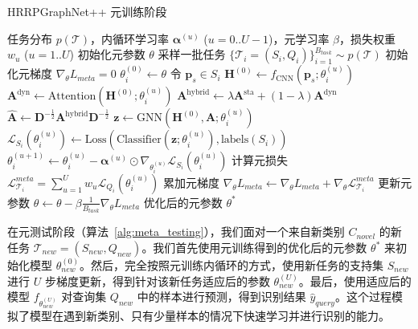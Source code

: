 \begin{algorithm}[h!]
\caption{HRRPGraphNet++ 元训练阶段}
\label{alg:meta_training}
\begin{algorithmic}[1]
\Require 任务分布 $p(\mathcal{T})$，内循环学习率 $\boldsymbol{\alpha}^{(u)}$ ($u=0..U-1$)，元学习率 $\beta$，损失权重 $w_u$ ($u=1..U$)
\State 初始化元参数 $\theta$
    \State 采样一批任务 $\{\mathcal{T}_i = (S_i, Q_i)\}_{i=1}^{B_{task}} \sim p(\mathcal{T})$ 
    \State 初始化元梯度 $\nabla_\theta L_{meta} = 0$
        \State $\theta_i^{(0)} \leftarrow \theta$
         
            \State 令 $\mathbf{p}_s \in S_i$
            \State $\mathbf{H}^{(0)} \leftarrow f_{\text{CNN}}(\mathbf{p}_s; \theta_i^{(u)})$ 
            \State $\mathbf{A}^{\text{dyn}} \leftarrow \text{Attention}(\mathbf{H}^{(0)}; \theta_i^{(u)})$ 
            \State $\mathbf{A}^{\text{hybrid}} \leftarrow \lambda \mathbf{A}^{\text{sta}} + (1-\lambda) \mathbf{A}^{\text{dyn}}$
            \State $\hat{\mathbf{A}} \leftarrow \mathbf{D}^{-\frac{1}{2}} \mathbf{A}^{\text{hybrid}} \mathbf{D}^{-\frac{1}{2}}$
            \State $\mathbf{z} \leftarrow \text{GNN}(\mathbf{H}^{(0)}, \hat{\mathbf{A}}; \theta_i^{(u)})$ 
            \State $\mathcal{L}_{S_i}(\theta_i^{(u)}) \leftarrow \text{Loss}( \text{Classifier}(\mathbf{z}; \theta_i^{(u)}), \text{labels}(S_i) )$
            \State $\theta_i^{(u+1)} \leftarrow \theta_i^{(u)} - \boldsymbol{\alpha}^{(u)} \odot \nabla_{\theta_i^{(u)}} \mathcal{L}_{S_i}(\theta_i^{(u)})$ 
        \EndFor
        \State 计算元损失 $\mathcal{L}_{\mathcal{T}_i}^{meta} = \sum_{u=1}^{U} w_u \mathcal{L}_{Q_i}(\theta_i^{(u)})$ 
        \State 累加元梯度 $\nabla_\theta L_{meta} \leftarrow \nabla_\theta L_{meta} + \nabla_\theta \mathcal{L}_{\mathcal{T}_i}^{meta}$ 
    \EndFor
    \State 更新元参数 $\theta \leftarrow \theta - \beta \frac{1}{B_{task}} \nabla_\theta L_{meta}$ 
\EndWhile
\State \Return 优化后的元参数 $\theta^*$
\end{algorithmic}
\end{algorithm}

在元测试阶段（算法~\ref{alg:meta_testing}），我们面对一个来自新类别 $C_{novel}$ 的新任务 $\mathcal{T}_{new} = (S_{new}, Q_{new})$。我们首先使用元训练得到的优化后的元参数 $\theta^*$ 来初始化模型 $\theta_{new}^{(0)}$。然后，完全按照元训练内循环的方式，使用新任务的支持集 $S_{new}$ 进行 $U$ 步梯度更新，得到针对该新任务适应后的参数 $\theta_{new}^{(U)}$。最后，使用适应后的模型 $f_{\theta_{new}^{(U)}}$ 对查询集 $Q_{new}$ 中的样本进行预测，得到识别结果 $\hat{y}_{query}$。这个过程模拟了模型在遇到新类别、只有少量样本的情况下快速学习并进行识别的能力。

